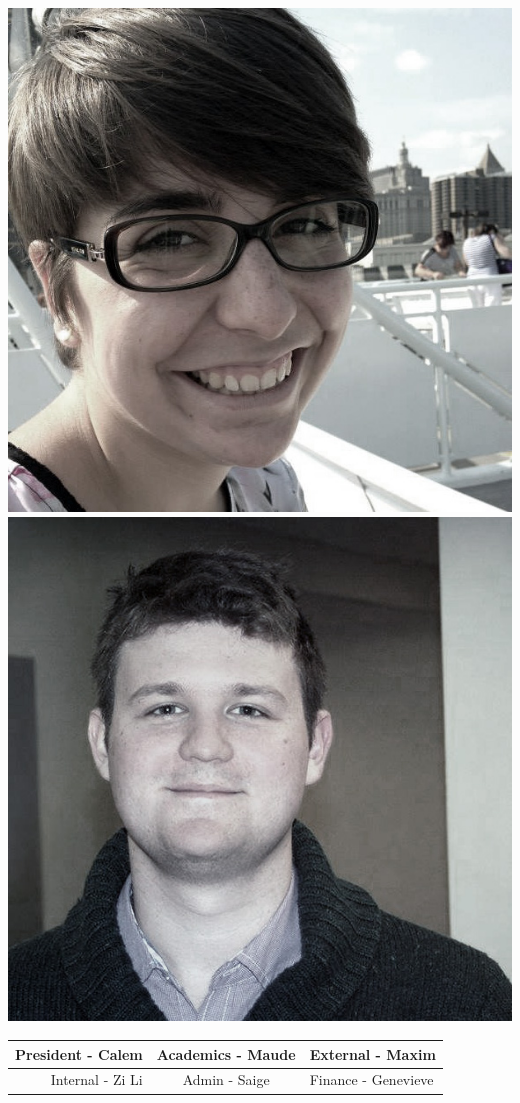 \begin{center}
	\includegraphics[width=.35\textheight]{gfx/maudethumb.jpg}
	\includegraphics[width=.35\textheight]{gfx/maximthumb.jpg}
	\vspace{.5em}\newline
	 	\begin{tabular}{r|c|l}
	 		President - Calem & Academics - Maude & External - Maxim\\ \hline
	 		Internal - Zi Li & Admin - Saige & Finance - Genevieve\\ 
	 		

\end{tabular}
\end{center}

